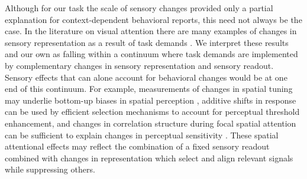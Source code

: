 Although for our task the scale of sensory changes provided only a partial explanation for context-dependent behavioral reports, this need not always be the case. In the literature on visual attention there are many examples of changes in sensory representation as a result of task demands \citep{Carrasco2011-xp}. We interpret these results and our own as falling within a continuum where task demands are implemented by complementary changes in sensory representation and sensory readout. Sensory effects that can alone account for behavioral changes would be at one end of this continuum. For example, measurements of changes in spatial tuning \citep{Kay2015-pd,Klein2014-oe,Vo2017-oi} may underlie bottom-up biases in spatial perception \citep{Klein2016-ox}, additive shifts in response \citep{Buracas2007-pe,Li2008-fe,Murray2008-xj} can be used by efficient selection mechanisms \citep{Chen2012-fu,Hara2014-mv,Pestilli2011-gi} to account for perceptual threshold enhancement, and changes in correlation structure during focal spatial attention \citep{Mitchell2009-do} can be sufficient to explain changes in perceptual sensitivity \citep{Cohen2010-xs,Cohen2009-bt}. These spatial attentional effects may reflect the combination of a fixed sensory readout combined with changes in representation which select \citep{Carrasco2011-xp} and align \citep{Ruff2018-yx} relevant signals while suppressing others.

